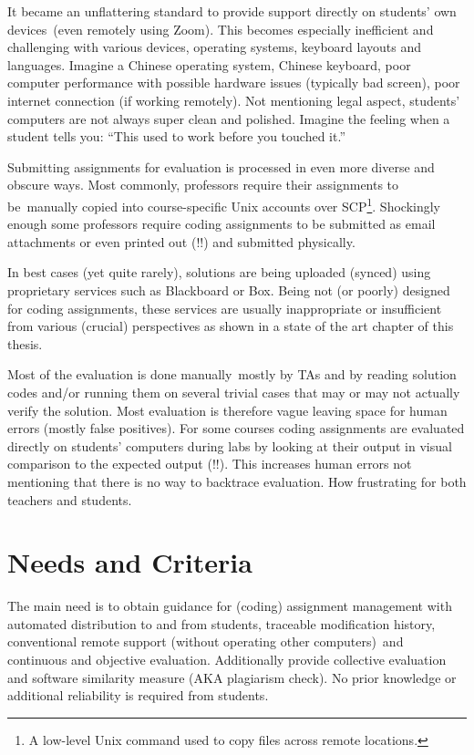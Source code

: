 {It became an unflattering standard to }{provide support directly on students' own devices}{~(even remotely using Zoom). This becomes especially inefficient and challenging with various devices, operating systems, keyboard layouts and languages. Imagine a Chinese operating system, Chinese keyboard, poor computer performance with possible hardware issues (typically bad screen), poor internet connection (if working remotely). Not mentioning legal aspect, students' computers are not always super clean and polished. Imagine the feeling when a student tells you: ``This used to work before you touched it.''}

{Submitting assignments for evaluation is processed in even more diverse and obscure ways. Most commonly, professors require their assignments to be}{~manually copied into course-specific Unix accounts over SCP}\footnote{A low-level Unix command used to copy files across remote locations.}{. Shockingly enough some professors require coding assignments to be submitted as email attachments or even printed out (!!) and submitted physically.}

{In best cases (yet quite rarely), solutions are being uploaded (synced) using proprietary services such as Blackboard or Box. Being not (or poorly) designed for coding assignments, these services are }{usually inappropriate or insufficient from various (crucial) perspectives as shown in a state of the art chapter of this thesis.}

{Most of the }{evaluation is done manually}{~mostly by TAs and by reading solution codes and/or running them on several trivial cases that may or may not actually verify the solution. Most evaluation is therefore vague leaving space for human errors (mostly false positives). For some courses coding assignments are evaluated directly on students' computers during labs by looking at their output in visual comparison to the expected output (!!). This increases human errors not mentioning that there is }{no way to backtrace evaluation}{. How frustrating for both teachers and students.}

\section{Needs and Criteria} \label{sec:criteria}

{The main need is to obtain guidance for (coding) assignment management with automated distribution to and from students, traceable modification history, conventional }{remote support (without operating other computers)}{~and continuous and objective evaluation. Additionally provide collective evaluation and software similarity measure (AKA plagiarism check). No prior knowledge or additional reliability is required from students.}

